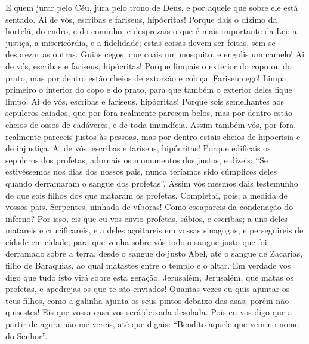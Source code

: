 {  E quem jurar pelo Céu, jura pelo trono de Deus, e por aquele que sobre ele está sentado.
  Ai de vós, escribas e fariseus, hipócritas! Porque dais o dízimo da hortelã, do endro, e do cominho, e desprezais o que é mais importante da Lei: a justiça, a misericórdia, e a fidelidade;
 estas coisas devem ser feitas, sem se desprezar as outras.
  Guias cegos, que coais um mosquito, e engolis um camelo!
  Ai de vós, escribas e fariseus, hipócritas! Porque limpais o exterior do copo ou do prato, mas por dentro estão cheios de extorsão e cobiça.
  Fariseu cego! Limpa primeiro o interior do copo e do prato, para que também o exterior deles fique limpo.
  Ai de vós, escribas e fariseus, hipócritas! Porque sois semelhantes aos sepulcros caiados, que por fora realmente parecem belos, mas por dentro estão cheios de ossos de cadáveres, e de toda imundícia.
  Assim também vós, por fora, realmente pareceis justos às pessoas, mas por dentro estais cheios de hipocrisia e de injustiça.
  Ai de vós, escribas e fariseus, hipócritas! Porque edificais os sepulcros dos profetas, adornais os monumentos dos justos,
  e dizeis: “Se estivéssemos nos dias dos nossos pais, nunca teríamos sido cúmplices deles quando derramaram o sangue
 dos profetas”.
  Assim vós mesmos dais testemunho de que sois filhos dos que mataram os profetas.
  Completai, pois, a medida de vossos pais.
  Serpentes, ninhada de víboras! Como escapareis da condenação do inferno?
  Por isso, eis que eu vos envio profetas, sábios, e escribas; a uns deles matareis e crucificareis, e a
{} deles açoitareis em vossas sinagogas, e perseguireis de cidade em cidade;
  para que venha sobre vós todo o sangue justo que foi derramado sobre a terra, desde o sangue do justo Abel, até o sangue de Zacarias, filho de Baraquias, ao qual matastes entre o templo e o altar.
  Em verdade vos digo que tudo isto virá sobre esta geração.
  Jerusalém, Jerusalém, que matas os profetas, e apedrejas os que te são enviados! Quantas vezes eu quis ajuntar os teus filhos, como a galinha ajunta os seus pintos debaixo das asas; porém não quisestes!
  Eis que vossa casa vos será deixada desolada.
  Pois eu vos digo que a partir de agora não me vereis, até que digais: “Bendito aquele que vem no nome do Senhor”.
{}
\par }

